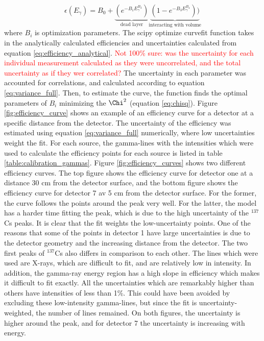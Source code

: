 \begin{equation} \label{eq:efficiency_estimated}
\epsilon(E_\gamma) =  B_0 + \underbrace{(e^{-B_1 E_\gamma^{B_2}})}_\text{dead layer}  \underbrace{(1-e^{-B_3 E_\gamma^{B_4}}))}_\text{interacting with volume} 
\end{equation}
\noindent 
where $B_i$ is optimization parameters. The scipy optimize curvefit function \cite{Virtanen2020} takes in the analytically calculated efficiencies and uncertainties calculated from equation \ref{eq:efficiency_analytical}. \textcolor{red}{Not 100\% sure: was the uncertainty for each individual measurement calculated as they were uncorrelated, and the total uncertainty as if they wer correlated?} The uncertainty in each parameter was accounted for correlations, and calculated according to equation \ref{eq:variance_full}. Then, to estimate the curve, the function finds the optimal parameters of $B_i$ minimizing the $\Chi^2$ (equation \ref{eq:chisq}). Figure \ref{fig:efficiency_curve} shows an example of an efficiency curve for a detector at a specific distance from the detector. The uncertainty of the efficiency was estimated using equation \ref{eq:variance_full} numerically, where low uncertainties weight the fit. For each source, the gamma-lines with the intensities which were used to calculate the efficiency points for each source is listed in table \ref{table:calibration_gammas}. Figure \ref{fig:efficiency_curves} shows two different efficiency curves. The top figure shows the efficiency curve for detector one at a distance 30 cm from the detector surface, and the bottom figure shows the efficiency curve for detector 7 av 5 cm from the detector surface. For the former, the curve follows the points around the peak very well. For the latter, the model has a harder time fitting the peak, which is due to the high uncertainty of the $^{137}$Cs peaks. It is clear that the fit weights the low-uncertainty points. One of the reasons that some of the points in detector 1 have large uncertainties is due to the detector geometry and the increasing distance from the detector. The two first peaks of $^{137}$Cs also differs in comparison to each other. The lines which were used are X-rays, which are difficult to fit, and are relatively low in intensity. In addition, the gamma-ray energy region has a high slope in efficiency which makes it difficult to fit exactly.  All the uncertainties which are remarkably higher than others have intensities of less than 1\%. This could have been avoided by excluding these low-intensity gamma-lines, but since the fit is uncertainty-weighted, the number of lines remained. On both figures, the uncertainty is higher around the peak, and for detector 7 the uncertainty is increasing with energy.   \\


